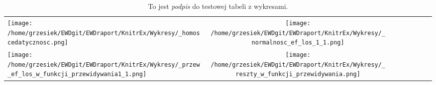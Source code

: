 \begin{table}[tb] 
\begin{tabularx}{\textwidth}{@{\hspace{1.7 mm}}Xccccccc@{\hspace{1.7 mm}}} 
\midrule 
   \texttt{[image: /home/grzesiek/EWDgit/EWDraport/KnitrEx/Wykresy/\_homoscedatycznosc.png]} & \texttt{[image: /home/grzesiek/EWDgit/EWDraport/KnitrEx/Wykresy/\_normalnosc\_ef\_los\_1\_1.png]} \\ 
   \texttt{[image: /home/grzesiek/EWDgit/EWDraport/KnitrEx/Wykresy/\_przew\_ef\_los\_w\_funkcji\_przewidywania1\_1.png]} & \texttt{[image: /home/grzesiek/EWDgit/EWDraport/KnitrEx/Wykresy/\_reszty\_w\_funkcji\_przewidywania.png]} \\ 
\end{tabularx} 
\caption*{ To jest \emph{podpis} do testowej tabeli z wykresami. } 
\end{table} 
 



